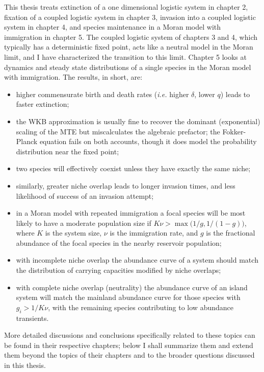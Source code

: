 
This thesis treats extinction of a one dimensional logistic system in chapter 2, fixation of a coupled logistic system in chapter 3, invasion into a coupled logistic system in chapter 4, and species maintenance in a Moran model with immigration in chapter 5. 
The coupled logistic system of chapters 3 and 4, which typically has a deterministic fixed point, acts like a neutral model in the Moran limit, and I have characterized the transition to this limit. 
Chapter 5 looks at dynamics and steady state distributions of a single species in the Moran model with immigration. 
The results, in short, are: 
\begin{itemize}
	\item higher commensurate birth and death rates (\emph{i.e.} higher $\delta$, lower $q$) leads to faster extinction; 
	\item the WKB approximation is usually fine to recover the dominant (exponential) scaling of the MTE but miscalculates the algebraic prefactor; the Fokker-Planck equation fails on both accounts, though it does model the probability distribution near the fixed point; 
	\item two species will effectively coexist unless they have exactly the same niche; 
	\item similarly, greater niche overlap leads to longer invasion times, and less likelihood of success of an invasion attempt; 
	\item in a Moran model with repeated immigration a focal species will be most likely to have a moderate population size if $K\nu > \max\big(1/g,1/(1-g)\big)$, where $K$ is the system size, $\nu$ is the immigration rate, and $g$ is the fractional abundance of the focal species in the nearby reservoir population;
	\item with incomplete niche overlap the abundance curve of a system should match the distribution of carrying capacities modified by niche overlaps;
	\item with complete niche overlap (neutrality) the abundance curve of an island system will match the mainland abundance curve for those species with $g_i>1/K\nu$, with the remaining species contributing to low abundance transients. 
\end{itemize}
More detailed discussions and conclusions specifically related to these topics can be found in their respective chapters; below I shall summarize them and extend them beyond the topics of their chapters and to the broader questions discussed in this thesis. 

